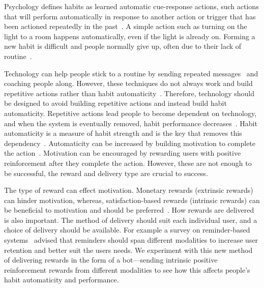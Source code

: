 \documentclass{scaffold/sigchi}
\begin{document}
Psychology defines habits as learned automatic cue-response actions, such actions that will perform automatically in response to another action or trigger that has been actioned repeatedly in the past~\cite{article_the_habitual_consumer}. A simple action such as turning on the light to a room happens automatically, even if the light is already on. Forming a new habit is difficult and people normally give up, often due to their lack of routine~\cite{article_promoting_habit_formation, article_the_habitual_consumer}.

Technology can help people stick to a routine by sending repeated messages~\cite{chi_crowd_designed_motivation} and coaching people along. However, these techniques do not always work and build repetitive actions rather than habit automaticity~\cite{coaching_not_that_good}. Therefore, technology should be designed to avoid building repetitive actions and instead build habit automaticity. Repetitive actions lead people to become dependent on technology, and when the system is eventually removed, habit performance decreases~\cite{article_dont_kick_habit, article_realtime_feedback_improving_medication_taking}. Habit automaticity is a measure of habit strength and is the key that removes this dependency~\cite{article_beyond_self_tracking_designing_apps}. Automaticity can be increased by building motivation to complete the action~\cite{article_a_self_efficacy, article_meta_analytic_review_intrinsic_motivation}.
Motivation can be encouraged by rewarding users with positive reinforcement after they complete the action. However, these are not enough to be successful, the reward and delivery type are crucial to success.

The type of reward can effect motivation. Monetary rewards (extrinsic rewards) can hinder motivation, whereas, satisfaction-based rewards (intrinsic rewards) can be beneficial to motivation and should be preferred~\cite{article_meta_analytic_review_intrinsic_motivation}.
How rewards are delivered is also important. The method of delivery should suit each individual user, and a choice of delivery should be available. For example a survey on reminder-based systems~\cite{article_user_centred_multimodal_reminders} advised that reminders should span different modalities to increase user retention and better suit the users needs.
We experiment with this new method of delivering rewards in the form of a bot---sending intrinsic positive reinforcement rewards from different modalities to see how this affects people's habit automaticity and performance.
\end{document}
